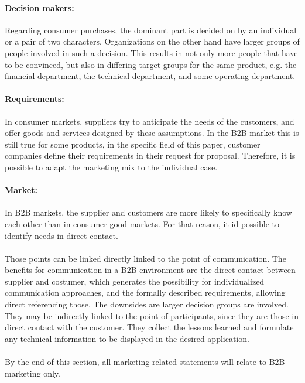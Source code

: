 \paragraph*{Decision makers:}Regarding consumer purchases, the dominant part is decided on by an individual or a pair of two characters. Organizations on the other hand have larger groups of people involved in such a decision. This results in not only more people that have to be convinced, but also in differing target groups for the same product, e.g. the financial department, the technical department, and some operating department. 
\paragraph*{Requirements:}In consumer markets, suppliers try to anticipate the needs of the customers, and offer goods and services designed by these assumptions. In the B2B market this is still true for some products, in the specific field of this paper, customer companies define their requirements in their request for proposal. Therefore, it is possible to adapt the marketing mix to the individual case.
\paragraph*{Market:}In B2B markets, the supplier and customers are more likely to specifically know each other than in consumer good markets. For that reason, it id possible to identify needs in direct contact.
\paragraph*{} Those points can be linked directly linked to the point of communication. The benefits for communication in a B2B environment are  the direct contact between supplier and costumer, which generates the possibility for individualized communication approaches, and the formally described requirements, allowing direct referencing those. The downsides are larger decision groups are involved. They may be indirectly linked to the point of participants, since they are those in direct contact with the customer. They collect the lessons learned and formulate any technical information to be displayed in the desired application.
\paragraph*{}By the end of this section, all marketing related statements will relate to B2B marketing only.
